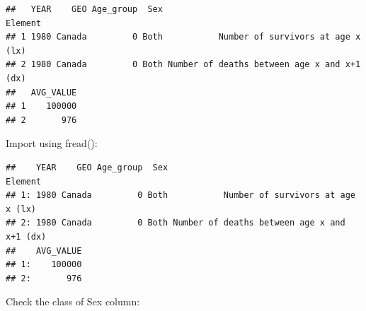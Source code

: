 \documentclass[]{book}
\newenvironment{Shaded}{\begin{snugshade}}{\end{snugshade}}
\newcommand{\DataTypeTok}[1]{\textcolor[rgb]{0.13,0.29,0.53}{#1}}
\newcommand{\DecValTok}[1]{\textcolor[rgb]{0.00,0.00,0.81}{#1}}
\newcommand{\KeywordTok}[1]{\textcolor[rgb]{0.13,0.29,0.53}{\textbf{#1}}}
\newcommand{\NormalTok}[1]{#1}
\newcommand{\OperatorTok}[1]{\textcolor[rgb]{0.81,0.36,0.00}{\textbf{#1}}}
\newcommand{\OtherTok}[1]{\textcolor[rgb]{0.56,0.35,0.01}{#1}}
\newcommand{\StringTok}[1]{\textcolor[rgb]{0.31,0.60,0.02}{#1}}
\begin{document}
\begin{Shaded}
\end{Shaded}

\begin{verbatim}
##   YEAR    GEO Age_group  Sex                                     Element
## 1 1980 Canada         0 Both           Number of survivors at age x (lx)
## 2 1980 Canada         0 Both Number of deaths between age x and x+1 (dx)
##   AVG_VALUE
## 1    100000
## 2       976
\end{verbatim}

Import using fread():

\begin{Shaded}
\end{Shaded}

\begin{verbatim}
##    YEAR    GEO Age_group  Sex                                     Element
## 1: 1980 Canada         0 Both           Number of survivors at age x (lx)
## 2: 1980 Canada         0 Both Number of deaths between age x and x+1 (dx)
##    AVG_VALUE
## 1:    100000
## 2:       976
\end{verbatim}

Check the class of Sex column:

\begin{Shaded}
\end{Shaded}
\end{document}
